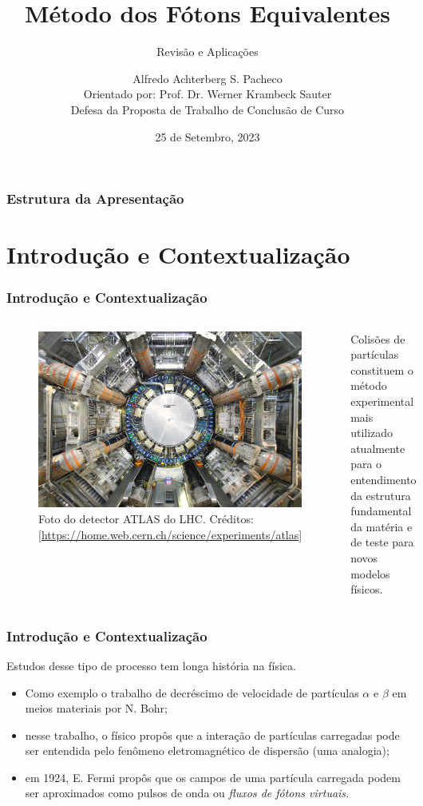 \documentclass[xcolor=dvipsnames]{beamer}
\title{Método dos Fótons Equivalentes}
\subtitle{Revisão e Aplicações}
\author[A. A. S. Pacheco]{
	Alfredo Achterberg S. Pacheco\\
	{\footnotesize Orientado por: Prof.  Dr. Werner Krambeck Sauter}\\
	{\scriptsize Defesa da Proposta de Trabalho de Conclusão de Curso}
}
\institute[UFPel]{
	Curso de Bacharelado em Física - Universidade Federal de Pelotas
}
\date[25 de set., 2023]{25 de Setembro, 2023}
\begin{document}
\frame{\titlepage}

\begin{frame}
\frametitle{Estrutura da Apresentação}
\tableofcontents
\end{frame}

\section{Introdução e Contextualização}

\begin{frame}
	\frametitle{Introdução e Contextualização}

	\begin{columns}
		\begin{figure}
			\includegraphics[width=\columnwidth]{./figs/atlan_normal.jpg}
			\caption{Foto do detector ATLAS do LHC. {\scriptsize Créditos:
			[\url{https://home.web.cern.ch/science/experiments/atlas}]}}
		\end{figure}
	
		Colisões de partículas constituem o método experimental mais utilizado
		atualmente para o entendimento da estrutura fundamental da matéria e de
		teste para novos modelos físicos.
	\end{columns}

\end{frame}

\begin{frame}
	\frametitle{Introdução e Contextualização}
	Estudos desse tipo de processo tem longa história na física.
	\begin{itemize}
		\item Como exemplo o trabalho de decréscimo de velocidade de partículas
			$\alpha$ e $\beta$ em meios materiais por N. Bohr;
		\item nesse trabalho, o físico propôs que a interação de partículas
			carregadas pode ser entendida pelo fenômeno eletromagnético de
			dispersão (uma analogia);
		\item em 1924, E. Fermi propôs que os campos de uma partícula carregada
			podem ser aproximados como pulsos de onda ou \textit{fluxos de
			fótons virtuais.}
	\end{itemize}
\end{frame}
\end{document}
